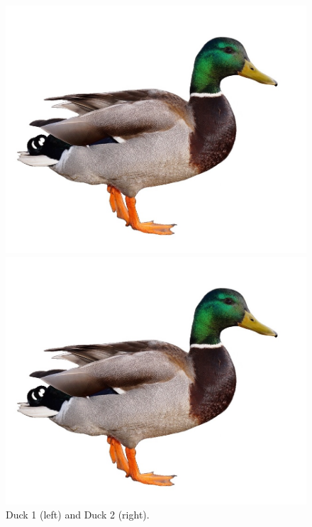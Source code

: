 \documentclass[
  letterpaper,
  DIV=11,
  numbers=noendperiod]{scrreprt}
\begin{document}
\begin{figure}

\begin{minipage}{0.50\linewidth}
\includegraphics{images/Duck.png}\end{minipage}%
%
\begin{minipage}{0.50\linewidth}
\includegraphics{images/Duck.png}\end{minipage}%

\caption{\label{fig-duck}Duck 1 (left) and Duck 2 (right).}

\end{figure}%
\end{document}
